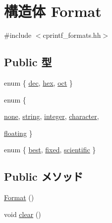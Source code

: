 \hypertarget{structcp_1_1Format}{
\section{構造体 Format}
\label{structcp_1_1Format}
}


{\ttfamily \#include $<$cprintf\_\-formats.hh$>$}\subsection*{Public 型}
\begin{DoxyCompactItemize}
\item 
enum \{ \hyperlink{structcp_1_1Format_af9bdc3014f3d54c426b6d2df10de4960a82022a5c9021c54619b7b00d1fede0ad}{dec}, 
\hyperlink{structcp_1_1Format_af9bdc3014f3d54c426b6d2df10de4960a6000f7a8e67e4e0beb7b8ebe93452243}{hex}, 
\hyperlink{structcp_1_1Format_af9bdc3014f3d54c426b6d2df10de4960a8f2c05194d91776b033f24e214c6e9df}{oct}
 \}
\item 
enum \{ \par
\hyperlink{structcp_1_1Format_adb49720dc49f7d4e4cf9adbf2948e409ab7e4e0120a041dbe6528b050c04269e0}{none}, 
\hyperlink{structcp_1_1Format_adb49720dc49f7d4e4cf9adbf2948e409a6b30bda829e4fe673ed1afb7101a4746}{string}, 
\hyperlink{structcp_1_1Format_adb49720dc49f7d4e4cf9adbf2948e409a9aef7263e1cd5f72bbf6b6aa3023224b}{integer}, 
\hyperlink{structcp_1_1Format_adb49720dc49f7d4e4cf9adbf2948e409afa40ef3af4fea0001b535318130960b2}{character}, 
\par
\hyperlink{structcp_1_1Format_adb49720dc49f7d4e4cf9adbf2948e409a4033246e68046207fc9b6ffd4d914535}{floating}
 \}
\item 
enum \{ \hyperlink{structcp_1_1Format_aae05225933a42f81e7c4a9fb286596f9a609ffbabbacd729dcbf3f03286149041}{best}, 
\hyperlink{structcp_1_1Format_aae05225933a42f81e7c4a9fb286596f9ab9ad6d537a019231f52c2e5ed22d5bfb}{fixed}, 
\hyperlink{structcp_1_1Format_aae05225933a42f81e7c4a9fb286596f9a6c696d0663c86c3c014a181f562d0cd9}{scientific}
 \}
\end{DoxyCompactItemize}
\subsection*{Public メソッド}
\begin{DoxyCompactItemize}
\item 
\hyperlink{structcp_1_1Format_aee29250b7e3c59f096b60d6228c2b4e8}{Format} ()
\item 
void \hyperlink{structcp_1_1Format_ac8bb3912a3ce86b15842e79d0b421204}{clear} ()
\end{DoxyCompactItemize}
